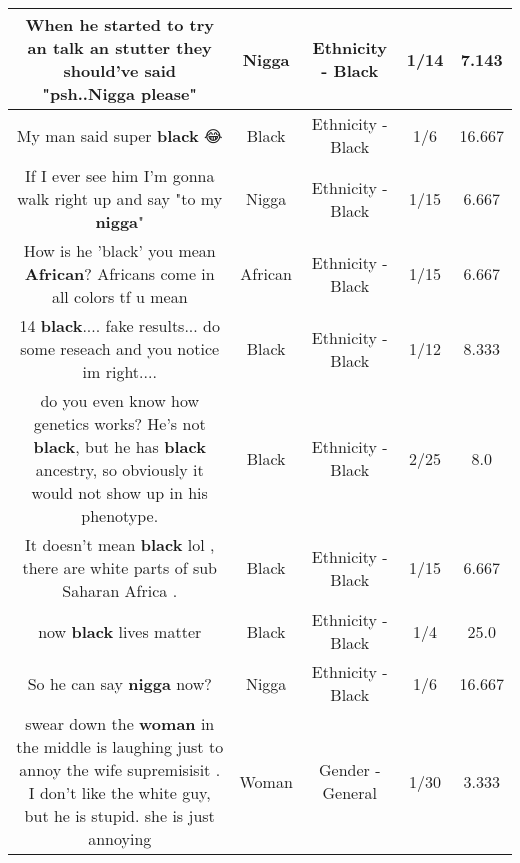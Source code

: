 \documentclass[11pt]{article}
\newlength\mylength
\begin{document}
\begin{center}
\begin{longtable}{|C{.65\mylength}|C{.30\mylength}|C{.12\mylength}|C{.12\mylength}|C{.12\mylength}|}
  \small When he started to try an talk an stutter they should've said "psh..\textbf{Nigga} please"\normalsize   & Nigga & Ethnicity - Black & 1/14 & 7.143 \\  \hline
  \small My man said super \textbf{black} 😂\normalsize   & Black & Ethnicity - Black & 1/6 & 16.667 \\  \hline
  \small If I ever see him I'm gonna walk right up and say "to my \textbf{nigga}"\normalsize   & Nigga & Ethnicity - Black & 1/15 & 6.667 \\  \hline
  \small How is he 'black' you mean \textbf{African}? Africans come in all colors tf u mean\normalsize   & African & Ethnicity - Black & 1/15 & 6.667 \\  \hline
  \small 14 \textbf{black}.... fake results... do some reseach and you notice im right....\normalsize   & Black & Ethnicity - Black & 1/12 & 8.333 \\  \hline
  \small do you even know how genetics works? He's not \textbf{black}, but he has \textbf{black} ancestry, so obviously it would not show up in his phenotype.\normalsize   & Black & Ethnicity - Black & 2/25 & 8.0 \\  \hline
  \small It doesn't mean \textbf{black} lol , there are white parts of sub Saharan Africa .\normalsize   & Black & Ethnicity - Black & 1/15 & 6.667 \\  \hline
  \small now \textbf{black} lives matter\normalsize   & Black & Ethnicity - Black & 1/4 & 25.0 \\  \hline
  \small So he can say \textbf{nigga} now?\normalsize   & Nigga & Ethnicity - Black & 1/6 & 16.667 \\  \hline
  \small swear down the \textbf{woman} in the middle is laughing just to annoy the wife supremisisit . I don't like the white guy, but he is stupid. she is just annoying\normalsize   & Woman & Gender - General & 1/30 & 3.333 \\  \hline

\end{longtable}
\end{center}
\end{document}
